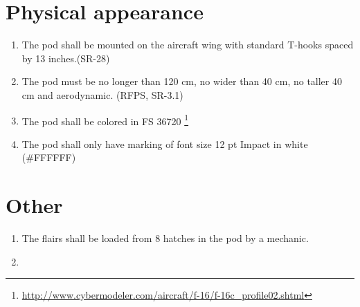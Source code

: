 \documentclass[Main]{subfiles}
\begin{document}
\section{Physical appearance}
\begin{enumerate}[resume*]

\item The pod shall be mounted on the aircraft wing with standard T-hooks spaced by 13 inches.(SR-28)

\item The pod must be no longer than 120 cm, no wider than 40 cm, no taller 40 cm and aerodynamic. (RFPS, SR-3.1)

\item The pod shall be colored in FS 36720 \footnote{\url{http://www.cybermodeler.com/aircraft/f-16/f-16c_profile02.shtml}}

\item The pod shall only have marking of font size 12 pt Impact in white (\#FFFFFF)

\end{enumerate}


\section{Other}

\begin{enumerate}[resume*]

\item The flairs shall be loaded from 8 hatches in the pod by a mechanic.

\item 

\end{enumerate}
\end{document}
